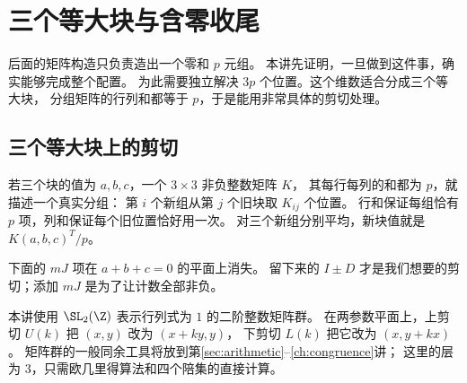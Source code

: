 \chapter{三个等大块与含零收尾}\label{sec:blocks}

后面的矩阵构造只负责造出一个零和 $p$ 元组。
本讲先证明，一旦做到这件事，确实能够完成整个配置。
为此需要独立解决 $3p$ 个位置。这个维数适合分成三个等大块，
分组矩阵的行列和都等于 $p$，于是能用非常具体的剪切处理。

\section{三个等大块上的剪切}


若三个块的值为 $a,b,c$，一个 $3\times3$ 非负整数矩阵 $K$，
其每行每列的和都为 $p$，就描述一个真实分组：
第 $i$ 个新组从第 $j$ 个旧块取 $K_{ij}$ 个位置。
行和保证每组恰有 $p$ 项，列和保证每个旧位置恰好用一次。
对三个新组分别平均，新块值就是 $K(a,b,c)^T/p$。

下面的 $mJ$ 项在 $a+b+c=0$ 的平面上消失。
留下来的 $I\pm D$ 才是我们想要的剪切；添加 $mJ$ 是为了让计数全部非负。


本讲使用 $\SL_2(\Z)$ 表示行列式为 $1$ 的二阶整数矩阵群。
在两参数平面上，上剪切 $U(k)$ 把 $(x,y)$ 改为 $(x+ky,y)$，
下剪切 $L(k)$ 把它改为 $(x,y+kx)$。
矩阵群的一般同余工具将放到第\ref{sec:arithmetic}--\ref{ch:congruence}讲；
这里的层为 $3$，只需欧几里得算法和四个陪集的直接计算。

